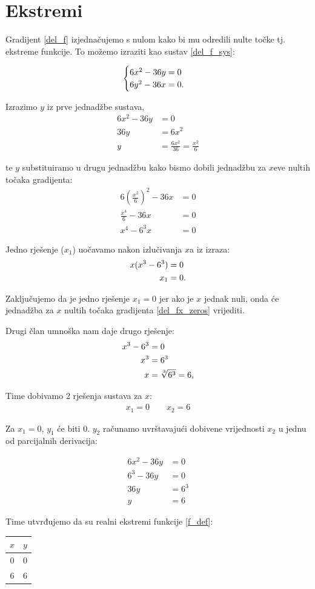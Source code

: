 \section{Ekstremi}

Gradijent \eqref{del_f} izjednačujemo s nulom kako bi mu odredili nulte točke tj. ekstreme funkcije.
To možemo izraziti kao sustav \eqref{del_f_sys}:

$$
\begin{cases}
    6x^2 - 36y = 0 \\
    6y^2 - 36x = 0 \textnormal{.}
\end{cases}
$$

Izrazimo $y$ iz prve jednadžbe sustava,
\begin{align*}
    6x^2 - 36y &= 0 \\
    36y &= 6x^2 \\
    y &= \frac{6x^2}{36} = \frac{x^2}{6}
\end{align*}

te $y$ substituiramo u drugu jednadžbu kako bismo dobili jednadžbu za $x$eve nultih točaka gradijenta:
\begin{align}
    6(\frac{x^2}{6})^2 - 36x &= 0 \nonumber \\
    \frac{x^4}{6} - 36x &= 0 \nonumber \\
    x^4 - 6^3x &= 0 \label{del_fx_zeros}
\end{align}

Jedno rješenje ($x_1$) uočavamo nakon izlučivanja $x$a iz izraza:
\begin{align*}
    x(x^3 - 6^3) &= 0 \\
    x_1 &= 0 \textnormal{.}
\end{align*}

Zaključujemo da je jedno rješenje $x_1 = 0$ jer ako je $x$ jednak nuli, onda će jednadžba za $x$ nultih točaka gradijenta \eqref{del_fx_zeros} vrijediti. \par

Drugi član umnoška nam daje drugo rješenje:
\begin{align*}
    x^3 - 6^3 &= 0 \\
    x^3 &= 6^3 \\
    x &= \sqrt[3]{6^3} = 6 \textnormal{,}
\end{align*}

Time dobivamo 2 rješenja sustava za $x$:
\begin{gather*}
    x_1 = 0 \qquad x_2 = 6
\end{gather*}

Za $x_1 = 0$, $y_1$ će biti $0$. $y_2$ računamo uvrštavajući dobivene vrijednosti $x_2$ u jednu od parcijalnih derivacija:

\begin{align*}
    6x^2 - 36y &= 0\\
    6^3 - 36y &= 0\\
    36y &= 6^3\\
    y &= 6
\end{align*}

Time utvrđujemo da su realni ekstremi funkcije \eqref{f_def}:

\begin{center}
\begin{tabular}{c | c}
    $x$ & $y$ \\
    \hline
    $0$ & $0$ \\
    $6$ & $6$ \\
\end{tabular}
\end{center}

\newpage